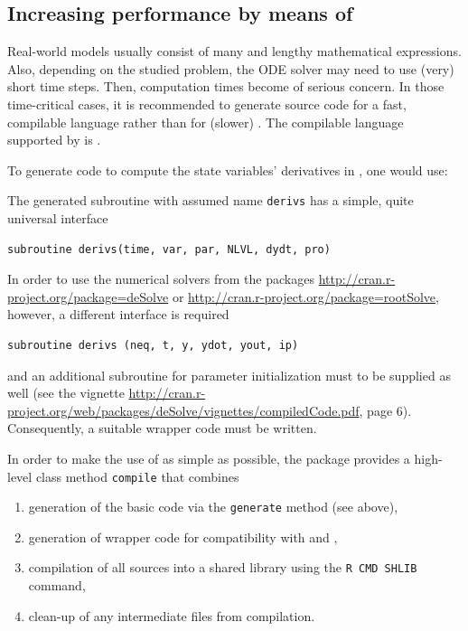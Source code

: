 \documentclass[onecolumn]{article}
\begin{document}
\subsection{Increasing performance by means of } \label{sec:advanced:fortran}

Real-world models usually consist of many and lengthy mathematical expressions. Also, depending on the studied problem, the ODE solver may need to use (very) short time steps. Then, computation times become of serious concern. In those time-critical cases, it is recommended to generate source code for a fast, compilable language rather than for (slower) . The compilable language supported by  is .

To generate code to compute the state variables' derivatives in , one would use:

\begin{Schunk}
\end{Schunk}

The generated  subroutine with assumed name \verb|derivs| has a simple, quite universal interface

\begin{verbatim}
subroutine derivs(time, var, par, NLVL, dydt, pro)
\end{verbatim}

In order to use the numerical solvers from the packages \url{http://cran.r-project.org/package=deSolve} or \url{http://cran.r-project.org/package=rootSolve}, however, a different interface is required

\begin{verbatim}
subroutine derivs (neq, t, y, ydot, yout, ip)
\end{verbatim}

and an additional subroutine for parameter initialization must to be supplied as well (see the  vignette \url{http://cran.r-project.org/web/packages/deSolve/vignettes/compiledCode.pdf}, page 6). Consequently, a suitable wrapper code must be written.

In order to make the use of  as simple as possible, the  package provides a high-level class method \verb|compile| that combines

\begin{enumerate}
\item generation of the basic  code via the \verb|generate| method (see above),
\item generation of wrapper code for compatibility with  and ,
\item compilation of all  sources into a shared library using the \verb|R CMD SHLIB| command,
\item clean-up of any intermediate files from compilation.
\end{enumerate}
\end{document}
